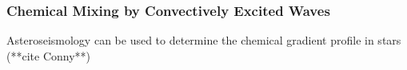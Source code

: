 {\color{purple}
\subsubsection{Chemical Mixing by Convectively Excited Waves}
}

Asteroseismology can be used to determine the chemical gradient profile in stars (**cite Conny**)

